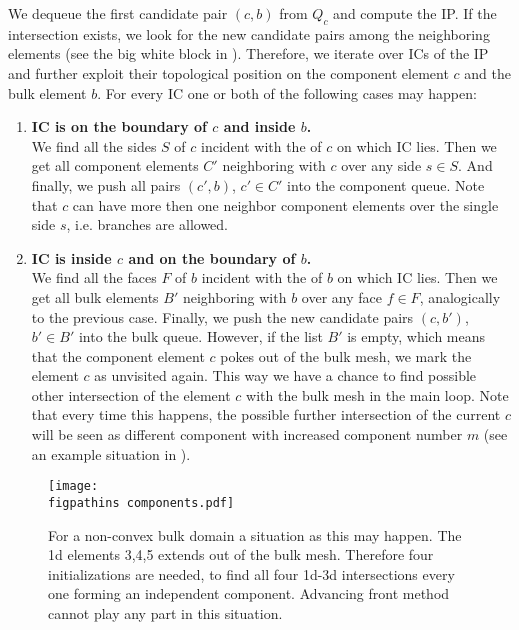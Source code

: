 We dequeue the first candidate pair $(c,b)$ from $Q_c$ and compute the IP.
If the intersection exists, we look for the new candidate pairs among the neighboring elements
(see the big white block in ).
Therefore, we iterate over ICs of the IP and further exploit their topological position on the component element $c$ and the bulk element $b$.
For every IC one or both of the following cases may happen:
\begin{enumerate}[label=(\alph*)]
    \item \textbf{IC is on the boundary of $c$  and inside $b$.} \\
            We find all the sides $S$ of $c$ incident with the \nface of $c$ on which IC lies. Then we get all component
            elements $C'$ neighboring with $c$ over any side $s\in S$. And finally, we push all pairs $(c',b)$, $c'\in C'$ 
            into the component queue. Note that $c$ can have more then one neighbor component elements over the single side $s$, i.e. branches are allowed.
    \item \textbf{IC is inside $c$ and on the boundary of $b$.} \label{enum:prolong2}\\
            We find all the faces $F$ of $b$ incident with the \nface of $b$ on which IC lies. 
            Then we get all bulk elements $B'$ neighboring with $b$ over any face $f\in F$,
            analogically to the previous case.
            Finally, we push the new candidate pairs $(c, b')$, $b'\in B'$ into the bulk queue.
            However, if the list $B'$ is empty, which means that the component element $c$ pokes out of the bulk mesh,
            we mark the element $c$ as unvisited again. This way we have a chance to find possible other intersection of the element
            $c$ with the bulk mesh in the main loop. Note that every time this happens, the possible further intersection 
            of the current $c$ will be seen as different component with increased component number $m$
            (see an example situation in ). 
\end{enumerate}

\begin{figure}[!htb]
    \centering
    \texttt{[image: \\figpathins components.pdf]}
    \caption[Components in non-convex bulk domain.]
    {For a non-convex bulk domain a situation as this may happen. The 1d elements 3,4,5 extends out of the bulk mesh.
    Therefore four initializations are needed, to find all four 1d-3d intersections every one forming an independent component. 
    Advancing front method cannot play any part in this situation.}
    \label{fig:components}
\end{figure}

